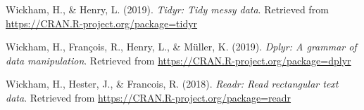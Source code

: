 \documentclass[man,draftall]{apa6}
\begin{document}
\hypertarget{ref-R-tidyr}{}
Wickham, H., \& Henry, L. (2019). \emph{Tidyr: Tidy messy data}.
Retrieved from \url{https://CRAN.R-project.org/package=tidyr}

\hypertarget{ref-R-dplyr}{}
Wickham, H., François, R., Henry, L., \& Müller, K. (2019). \emph{Dplyr:
A grammar of data manipulation}. Retrieved from
\url{https://CRAN.R-project.org/package=dplyr}

\hypertarget{ref-R-readr}{}
Wickham, H., Hester, J., \& Francois, R. (2018). \emph{Readr: Read
rectangular text data}. Retrieved from
\url{https://CRAN.R-project.org/package=readr}

\endgroup
\end{document}
